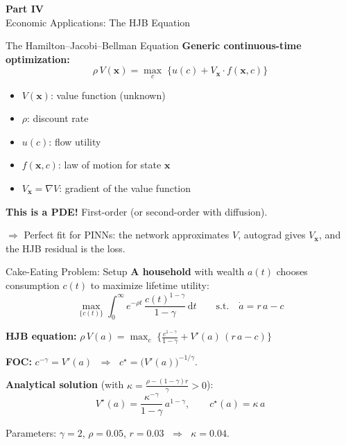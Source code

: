 \documentclass[aspectratio=169,11pt]{beamer}
\newcommand{\emphc}[1]{\textcolor{harvardcrimson}{#1}}
\newcommand{\x}{\bm{x}}
\begin{document}
\begin{frame}{}
\vfill
\begin{center}
{\Huge \textcolor{uzhblue}{\textbf{Part IV}}}\\[12pt]
{\LARGE Economic Applications: The HJB Equation}
\end{center}
\vfill
\end{frame}

\begin{frame}{The Hamilton--Jacobi--Bellman Equation}
\textbf{Generic continuous-time optimization:}
\[
\rho\, V(\x) = \max_{c}\;\bigl\{u(c) + V_{\x}\cdot f(\x, c)\bigr\}
\]

\vspace{0.3em}
\begin{itemize}
    \item $V(\x)$: \emphc{value function} (unknown)
    \item $\rho$: discount rate
    \item $u(c)$: flow utility
    \item $f(\x,c)$: law of motion for state $\x$
    \item $V_{\x} = \nabla V$: gradient of the value function
\end{itemize}

\vspace{0.4em}
\textbf{This is a PDE!} First-order (or second-order with diffusion).

\vspace{0.3em}
$\Rightarrow$ \emphc{Perfect fit for PINNs:} the network approximates $V$, autograd gives $V_{\x}$, and the HJB residual is the loss.
\end{frame}

\begin{frame}{Cake-Eating Problem: Setup}
\textbf{A household} with wealth $a(t)$ chooses consumption $c(t)$ to maximize lifetime utility:
\[
\max_{\{c(t)\}} \int_0^\infty e^{-\rho t}\,\frac{c(t)^{1-\gamma}}{1-\gamma}\,\mathrm{d}t
\qquad\text{s.t.}\quad \dot{a} = r\,a - c
\]

\textbf{HJB equation:}\quad
$\rho\,V(a) = \max_c\;\bigl\{\frac{c^{1-\gamma}}{1-\gamma} + V'(a)\,(r\,a - c)\bigr\}$

\vspace{0.2em}
\textbf{FOC:} $c^{-\gamma} = V'(a)$ $\;\Rightarrow\;$ $c^\star = \bigl(V'(a)\bigr)^{-1/\gamma}$.

\vspace{0.2em}
\textbf{Analytical solution} (with $\kappa = \frac{\rho - (1-\gamma)r}{\gamma} > 0$):
\[
V^\star(a) = \frac{\kappa^{-\gamma}}{1-\gamma}\,a^{1-\gamma}, \qquad c^\star(a) = \kappa\,a
\]

{\small Parameters: $\gamma = 2$, $\rho = 0.05$, $r = 0.03$ $\;\Rightarrow\;$ $\kappa = 0.04$.}
\end{frame}
\end{document}

